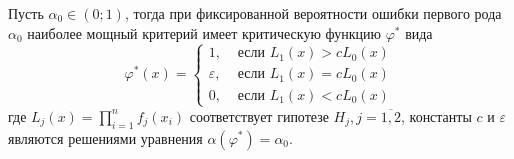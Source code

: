 \begin{namedthm}
Пусть $\alpha_{0} \in(0;1)$, тогда при фиксированной вероятности ошибки первого рода $\alpha_{0}$ наиболее мощный критерий имеет критическую функцию $\varphi^{*}$ вида
\begin{equation*}
    \varphi^{*}(x)=\left\{\begin{array}{ll}
    1, & \text { если } L_{1}(x)>c L_{0}(x) \\
    \varepsilon, & \text { если } L_{1}(x)=c L_{0}(x) \\
    0, & \text { если } L_{1}(x)<c L_{0}(x)
    \end{array}\right.
\end{equation*}
где $L_{j}(x)=\prod_{i=1}^{n} f_{j}\left(x_{i}\right)$ соответствует гипотезе $H_j, j = \overline{1,2}$, константы $c$ и $\varepsilon$ являются решениями уравнения $\alpha\left(\varphi^{*}\right)=\alpha_{0}$.
\end{namedthm}

